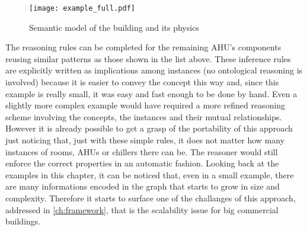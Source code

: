 \begin{figure}
  \centering
  \texttt{[image: example\_full.pdf]}
  \caption{Semantic model of the building and its physics}
  \label{fig:ex_building_full}
\end{figure}
The reasoning rules can be completed for the remaining AHU's components reusing similar patterns as those shown in the list above.
These inference rules are explicitly written as implications among instances (no ontological reasoning is involved) because it is easier to convey the concept this way and, since this example is really small, it was easy and fast enough to be done by hand. Even a slightly more complex example would have required a more refined reasoning scheme involving the concepts, the instances and their mutual relationships. However it is already possible to get a grasp of the portability of this approach just noticing that, just with these simple rules, it does not matter how many instances of rooms, AHUs or chillers there can be. The reasoner would still enforce the correct properties in an automatic fashion.
Looking back at the examples in this chapter, it can be noticed that, even in a small example, there are many informations encoded in the graph that starts to grow in size and complexity. Therefore it starts to surface one of the challanges of this approach, addressed in \autoref{ch:framework}, that is the scalability issue for big commercial buildings.
